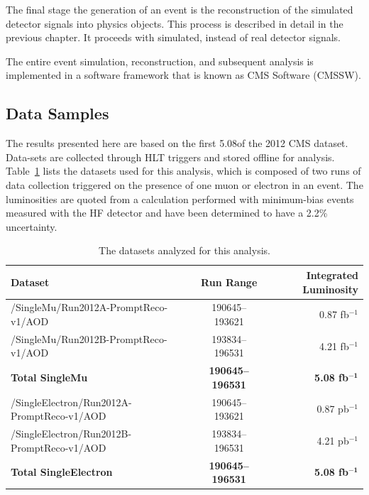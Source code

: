\par The final stage the generation of an event is the reconstruction
of the simulated detector signals into physics objects.  This process
is described in detail in the previous chapter.  It proceeds with
simulated, instead of real detector signals.  

\par The entire event simulation, reconstruction, and subsequent
analysis is implemented in a software framework that is known as CMS
Software (CMSSW).  

\subsection{Data Samples}
\label{data_overview}

\par The results presented here are based on the first 5.08\fbinv of the
2012 CMS dataset.  Data-sets are collected through HLT triggers and
stored offline for analysis.  Table~\ref{tab:dataSamples} lists the datasets used
for this analysis, which is composed of two runs of data collection
triggered on the presence of one muon or electron in an event.
The luminosities are quoted from a calculation performed with
minimum-bias events measured with the HF detector and have been
determined to have a 2.2\% uncertainty.   

\begin{table}[hbtp]\footnotesize
\centering
\begin{tabular}{|l|c|r|}
\hline\hline
 Dataset & Run Range & Integrated Luminosity \\
\hline
/SingleMu/Run2012A-PromptReco-v1/AOD & 190645--193621 & 0.87 fb$^{-1}$ \\
/SingleMu/Run2012B-PromptReco-v1/AOD & 193834--196531 & 4.21 fb$^{-1}$ \\
{\bf Total SingleMu} & {\bf 190645--196531} & {\bf 5.08 fb$\mathbf{^{-1}}$} \\
\hline
/SingleElectron/Run2012A-PromptReco-v1/AOD & 190645--193621 & 0.87 pb$^{-1}$ \\
/SingleElectron/Run2012B-PromptReco-v1/AOD & 193834--196531 & 4.21 pb$^{-1}$ \\
{\bf Total SingleElectron} & {\bf 190645--196531} & {\bf 5.08 fb$\mathbf{^{-1}}$} \\
\hline\hline
\end{tabular}
\caption{The datasets analyzed for this analysis.}
\label{tab:dataSamples}
\end{table}

